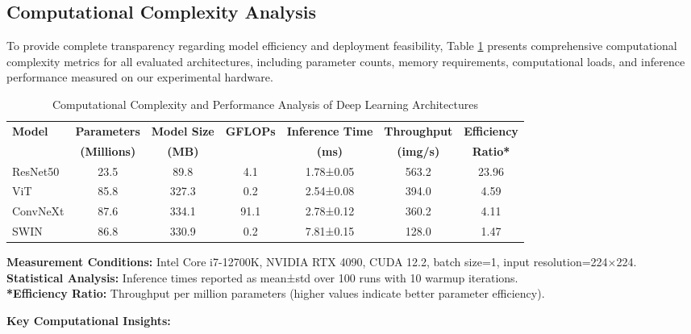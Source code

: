 \documentclass[sn-mathphys]{sn-jnl}
\theoremstyle{thmstyleone}%
\theoremstyle{thmstyletwo}%
\theoremstyle{thmstylethree}%
\begin{document}
\subsection*{Computational Complexity Analysis}

To provide complete transparency regarding model efficiency and deployment feasibility, Table \ref{tab:computational_complexity} presents comprehensive computational complexity metrics for all evaluated architectures, including parameter counts, memory requirements, computational loads, and inference performance measured on our experimental hardware.

\begin{table}[h!]
\centering
\footnotesize
\caption{Computational Complexity and Performance Analysis of Deep Learning Architectures}
\label{tab:computational_complexity}
\begin{tabular}{@{}lcccccc@{}}
\toprule
\textbf{Model} & \textbf{Parameters} & \textbf{Model Size} & \textbf{GFLOPs} & \textbf{Inference Time} & \textbf{Throughput} & \textbf{Efficiency} \\
& \textbf{(Millions)} & \textbf{(MB)} & & \textbf{(ms)} & \textbf{(img/s)} & \textbf{Ratio*} \\
\midrule
ResNet50 & 23.5 & 89.8 & 4.1 & 1.78±0.05 & 563.2 & 23.96 \\
ViT & 85.8 & 327.3 & 0.2 & 2.54±0.08 & 394.0 & 4.59 \\
ConvNeXt & 87.6 & 334.1 & 91.1 & 2.78±0.12 & 360.2 & 4.11 \\
SWIN & 86.8 & 330.9 & 0.2 & 7.81±0.15 & 128.0 & 1.47 \\
\bottomrule
\end{tabular}

\vspace{0.3cm}
\footnotesize
\textbf{Measurement Conditions:} Intel Core i7-12700K, NVIDIA RTX 4090, CUDA 12.2, batch size=1, input resolution=224×224. \\
\textbf{Statistical Analysis:} Inference times reported as mean±std over 100 runs with 10 warmup iterations. \\
\textbf{*Efficiency Ratio:} Throughput per million parameters (higher values indicate better parameter efficiency).
\end{table}

\textbf{Key Computational Insights:}
\end{document}
